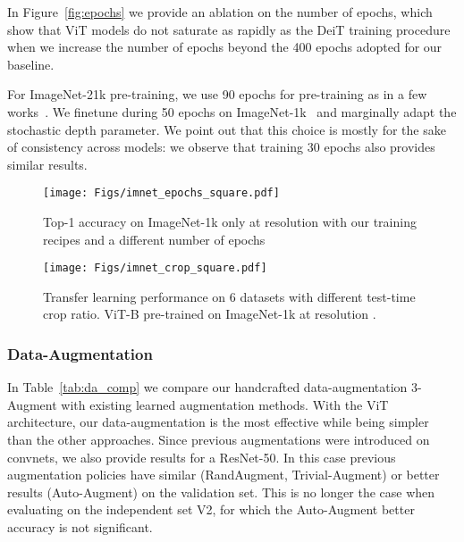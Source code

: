 In Figure~\ref{fig:epochs} we provide an ablation on the number of epochs, which show that ViT models do not saturate as rapidly as the DeiT training procedure~\cite{Touvron2020TrainingDI} when we increase the number of epochs beyond the 400 epochs adopted for our baseline.

For ImageNet-21k pre-training, we use 90 epochs for pre-training as in a few works~\cite{liu2021swin,Touvron2021AugmentingCN}. We finetune during 50 epochs on ImageNet-1k~\cite{Touvron2021AugmentingCN} and marginally adapt the stochastic depth parameter. We point out that this choice is mostly for the sake of consistency across models: we observe that training 30 epochs also provides similar results. 




\begin{figure}
    \centering
    \begin{minipage}{0.48 \linewidth}
    \centering
    \texttt{[image: Figs/imnet\_epochs\_square.pdf]}
    \caption{Top-1 accuracy on ImageNet-1k only at resolution  with our training recipes and a different number of epochs \label{fig:epochs}}
    \end{minipage}
    \hfill
    \begin{minipage}{0.49 \linewidth}
    \centering
    \texttt{[image: Figs/imnet\_crop\_square.pdf]}
    \caption{Transfer learning performance on 6 datasets with different test-time crop ratio. ViT-B pre-trained on ImageNet-1k at resolution . 
    \label{fig:crop}}
    \end{minipage}
\end{figure}

\subsubsection{Data-Augmentation}
In Table~\ref{tab:da_comp} we compare our handcrafted data-augmentation 3-Augment with existing learned augmentation methods. 
With the ViT architecture, our data-augmentation is the most effective while being simpler than the other approaches. 
Since previous augmentations were introduced on convnets, we also provide results for a ResNet-50. In this case previous augmentation policies have similar (RandAugment, Trivial-Augment) or better results (Auto-Augment) on the validation set. This is no longer the case when evaluating on the independent set V2, for which the Auto-Augment better accuracy is not significant. 

